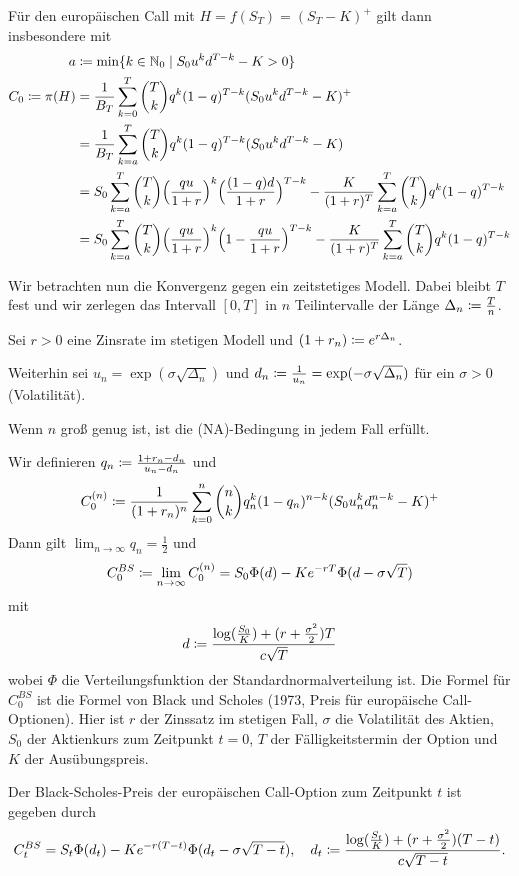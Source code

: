 \documentclass[a4paper,twoside,DIV15,BCOR12mm]{scrbook}
\begin{document}
Für den europäischen Call mit $H=f(S_T)=(S_T-K)^+$ gilt dann insbesondere mit
\begin{align*}
a &\da \min\{ k \in \MdN_0 \mid S_0 u^k d^{T-k} - K > 0 \} \\
C_0 \da \pi(H) &= \frac1{B_T} \sum_{k=0}^T \binom Tk q^k (1-q)^{T-k} (S_0 u^k d^{T-k} - K)^+ \\
&= \frac1{B_T} \sum_{k=a}^T \binom Tk q^k (1-q)^{T-k} (S_0 u^k d^{T-k} - K) \\
&= S_0 \sum_{k=a}^T \binom Tk \Big(\frac{q u}{1+r}\Big)^k \Big(\frac{(1-q)d}{1+r}\Big)^{T-k} - \frac{K}{(1+r)^T} \sum_{k=a}^T \binom Tk q^k (1-q)^{T-k} \\
&= S_0 \sum_{k=a}^T \binom Tk \Big(\frac{q u}{1+r}\Big)^k \Big(1- \frac{	qu}{1+r}\Big)^{T-k} - \frac{K}{(1+r)^T} \sum_{k=a}^T \binom Tk q^k (1-q)^{T-k}
\end{align*}

Wir betrachten nun die Konvergenz gegen ein zeitstetiges Modell. Dabei bleibt $T$ fest und wir zerlegen das Intervall $[0,T]$ in $n$ Teilintervalle der Länge $\Delta_n \da \frac Tn$.

Sei $r>0$ eine Zinsrate im stetigen Modell und $(1+r_n)\da e^{r\Delta_n}$.

Weiterhin sei  $u_n = \exp(\sigma \sqrt{\Delta_n})$ und $d_n \da \frac{1}{u_n} = \exp(-\sigma \sqrt{\Delta_n})$ für ein $\sigma>0$ (Volatilität).

Wenn $n$ groß genug ist, ist die (NA)-Bedingung in jedem Fall erfüllt.

Wir definieren $q_n\da \frac{1 + r_n - d_n}{u_n-d_n}$ und 
\[
C_0^{(n)} \da \frac 1{(1+r_n)^n} \sum_{k=0}^n \binom n k q_n^k(1-q_n)^{n-k} (S_0 u_n^k d_n^{n-k} - K)^+
\]
Dann gilt $\lim_{n\to\infty} q_n= \frac 12$ und
\[
C_0^{BS} \da \lim_{n\to\infty} C_0^{(n)} = S_0 \Phi(d) - Ke^{-rT}\Phi(d-\sigma\sqrt{T})
\]
mit
\[
d \da \frac{\log(\frac{S_0}K) + (r + \frac{\sigma^2}{2})T}{c \sqrt{T}}
\]
wobei $\Phi$ die Verteilungsfunktion der Standardnormalverteilung ist. Die Formel für $C_0^{BS}$ ist die Formel von Black und Scholes (1973, Preis für europäische Call-Optionen). Hier ist $r$ der Zinssatz im stetigen Fall, $\sigma$ die Volatilität des Aktien, $S_0$ der Aktienkurs zum Zeitpunkt $t=0$, $T$ der Fälligkeitstermin der Option und $K$ der Ausübungspreis.

Der Black-Scholes-Preis der europäischen Call-Option zum Zeitpunkt $t$ ist gegeben durch
\[
C_t^{BS} = S_t\Phi(d_t) - Ke^{-r(T-t)}\Phi(d_t - \sigma\sqrt{T-t}),\quad d_t \da \frac{\log(\frac{S_t}K) + (r + \frac{\sigma^2}{2})(T-t)}{c \sqrt{T-t}}.
\] 
\end{document}
